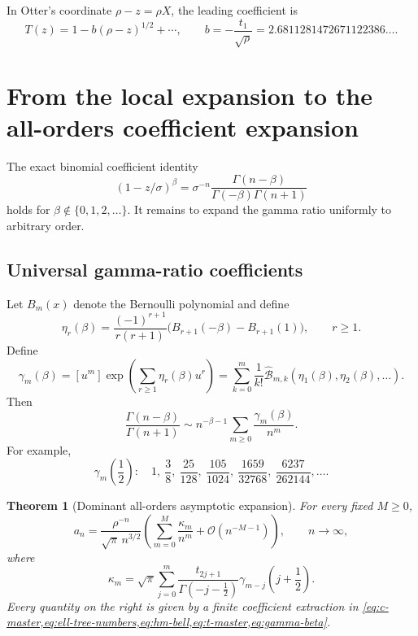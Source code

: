 \documentclass[11pt]{article}
\newtheorem{theorem}{Theorem}[section]
\theoremstyle{definition}
\theoremstyle{remark}
\newcommand{\Bell}{\widehat{\mathcal B}}
\newcommand{\BigO}{\mathcal O}
\begin{document}
In Otter's coordinate $\rho-z=\rho X$, the leading coefficient is
\[
 T(z)=1-b(\rho-z)^{1/2}+\cdots,
 \qquad
 b=-\frac{t_1}{\sqrt\rho}
 =2.6811281472671122386\ldots.
\]

\section{From the local expansion to the all-orders coefficient expansion}
\label{sec:forward}

The exact binomial coefficient identity
\begin{equation}
 [z^n](1-z/\sigma)^\beta
 =\sigma^{-n}\frac{\Gamma(n-\beta)}
 {\Gamma(-\beta)\Gamma(n+1)}
 \label{eq:exact-transfer}
\end{equation}
holds for $\beta\notin\{0,1,2,\ldots\}$.  It remains to expand the gamma
ratio uniformly to arbitrary order.

\subsection{Universal gamma-ratio coefficients}

Let $B_m(x)$ denote the Bernoulli polynomial and define
\begin{equation}
 \eta_r(\beta)=
 \frac{(-1)^{r+1}}{r(r+1)}
 \bigl(B_{r+1}(-\beta)-B_{r+1}(1)\bigr),
 \qquad r\geq1.
 \label{eq:eta-beta}
\end{equation}
Define
\begin{equation}
 \gamma_m(\beta)
 =[u^m]\exp\left(\sum_{r\geq1}\eta_r(\beta)u^r\right)
 =\sum_{k=0}^m\frac1{k!}
 \Bell_{m,k}(\eta_1(\beta),\eta_2(\beta),\ldots).
 \label{eq:gamma-beta}
\end{equation}
Then
\begin{equation}
 \frac{\Gamma(n-\beta)}{\Gamma(n+1)}
 \sim n^{-\beta-1}\sum_{m\geq0}\frac{\gamma_m(\beta)}{n^m}.
 \label{eq:gamma-ratio}
\end{equation}
For example,
\[
 \gamma_m\!\left(\frac12\right):
 \quad
 1,\ \frac38,\ \frac{25}{128},\ \frac{105}{1024},\
 \frac{1659}{32768},\ \frac{6237}{262144},\ldots.
\]

\begin{theorem}[Dominant all-orders asymptotic expansion]
\label{thm:forward}
For every fixed $M\geq0$,
\begin{equation}
 a_n=\frac{\rho^{-n}}{\sqrt{\pi}\,n^{3/2}}
 \left(\sum_{m=0}^M\frac{\kappa_m}{n^m}
 +\BigO(n^{-M-1})\right),
 \qquad n\to\infty,
 \label{eq:forward-asymptotic}
\end{equation}
where
\begin{equation}
 \boxed{
 \kappa_m=\sqrt\pi
 \sum_{j=0}^m
 \frac{t_{2j+1}}{\Gamma(-j-\tfrac12)}
 \gamma_{m-j}\!\left(j+\frac12\right).}
 \label{eq:kappa-master}
\end{equation}
Every quantity on the right is given by a finite coefficient extraction in
\cref{eq:c-master,eq:ell-tree-numbers,eq:hm-bell,eq:t-master,eq:gamma-beta}.
\end{theorem}
\end{document}
